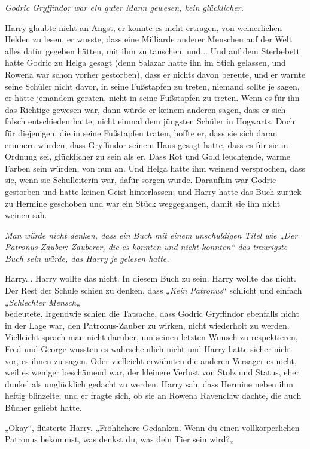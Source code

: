 {\emph{Godric Gryffindor war ein guter Mann gewesen, kein glücklicher.}

Harry glaubte nicht an Angst, er konnte es nicht ertragen, von weinerlichen Helden zu lesen, er wusste, dass eine Milliarde anderer Menschen auf der Welt alles dafür gegeben hätten, mit ihm zu tauschen, und... Und auf dem Sterbebett hatte Godric zu Helga gesagt (denn Salazar hatte ihn im Stich gelassen, und Rowena war schon vorher gestorben), dass er nichts davon bereute, und er warnte seine Schüler nicht davor, in seine Fußstapfen zu treten, niemand sollte je sagen, er hätte jemandem geraten, nicht in seine Fußstapfen zu treten. Wenn es für ihn das Richtige gewesen war, dann würde er keinem anderen sagen, dass er sich falsch entschieden hatte, nicht einmal dem jüngsten Schüler in Hogwarts. Doch für diejenigen, die in seine Fußstapfen traten, hoffte er, dass sie sich daran erinnern würden, dass Gryffindor seinem Haus gesagt hatte, dass es für sie in Ordnung sei, glücklicher zu sein als er. Dass Rot und Gold leuchtende, warme Farben sein würden, von nun an. Und Helga hatte ihm weinend versprochen, dass sie, wenn sie Schulleiterin war, dafür sorgen würde. Daraufhin war Godric gestorben und hatte keinen Geist hinterlassen; und Harry hatte das Buch zurück zu Hermine geschoben und war ein Stück weggegangen, damit sie ihn nicht weinen sah.

\emph{Man würde nicht denken, dass ein Buch mit einem unschuldigen Titel wie „Der Patronus-Zauber: Zauberer, die es konnten und nicht konnten“ das traurigste Buch sein würde, das Harry je gelesen hatte.}

Harry... Harry wollte das nicht. In diesem Buch zu sein. Harry wollte das nicht. Der Rest der Schule schien zu denken, dass „\emph{Kein Patronus}“ schlicht und einfach „\emph{Schlechter Mensch}„\\ bedeutete. Irgendwie schien die Tatsache, dass Godric Gryffindor ebenfalls nicht in der Lage war, den Patronus-Zauber zu wirken, nicht wiederholt zu werden. Vielleicht sprach man nicht darüber, um seinen letzten Wunsch zu respektieren, Fred und George wussten es wahrscheinlich nicht und Harry hatte sicher nicht vor, es ihnen zu sagen. Oder vielleicht erwähnten die anderen Versager es nicht, weil es weniger beschämend war, der kleinere Verlust von Stolz und Status, eher dunkel als unglücklich gedacht zu werden. Harry sah, dass Hermine neben ihm heftig blinzelte; und er fragte sich, ob sie an Rowena Ravenclaw dachte, die auch Bücher geliebt hatte.

„Okay“, flüsterte Harry. „Fröhlichere Gedanken. Wenn du einen vollkörperlichen Patronus bekommst, was denkst du, was dein Tier sein wird?„

}
